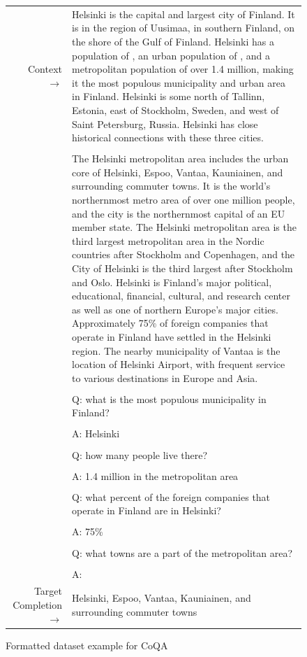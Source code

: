 \documentclass{article}
\begin{document}
\begin{figure} { \tt \footnotesize \begin{tabularx}{\linewidth}{r X} \toprule Context $\to$ & Helsinki is the capital and largest city of Finland. It is in the region of Uusimaa, in southern Finland, on the shore of the Gulf of Finland. Helsinki has a population of , an urban population of , and a metropolitan population of over 1.4 million, making it the most populous municipality and urban area in Finland. Helsinki is some north of Tallinn, Estonia, east of Stockholm, Sweden, and west of Saint Petersburg, Russia. Helsinki has close historical connections with these three cities. \\
 &  \\ 
 & The Helsinki metropolitan area includes the urban core of Helsinki, Espoo, Vantaa, Kauniainen, and surrounding commuter towns. It is the world's northernmost metro area of over one million people, and the city is the northernmost capital of an EU member state. The Helsinki metropolitan area is the third largest metropolitan area in the Nordic countries after Stockholm and Copenhagen, and the City of Helsinki is the third largest after Stockholm and Oslo. Helsinki is Finland's major political, educational, financial, cultural, and research center as well as one of northern Europe's major cities. Approximately 75\% of foreign companies that operate in Finland have settled in the Helsinki region. The nearby municipality of Vantaa is the location of Helsinki Airport, with frequent service to various destinations in Europe and Asia. \\ 
 &  \\ 
 & Q: what is the most populous municipality in Finland? \\ 
 &  \\ 
 & A: Helsinki \\ 
 &  \\ 
 & Q: how many people live there? \\ 
 &  \\ 
 & A: 1.4 million in the metropolitan area \\ 
 &  \\ 
 & Q: what percent of the foreign companies that operate in Finland are in Helsinki? \\ 
 &  \\ 
 & A: 75\% \\ 
 &  \\ 
 & Q: what towns are a part of the metropolitan area? \\ 
 &  \\ 
 & A: \\ 
 \midrule Target Completion $\to$ & Helsinki, Espoo, Vantaa, Kauniainen, and surrounding commuter towns \\
\bottomrule \end{tabularx} }  \caption{Formatted dataset example for CoQA}  \label{eval:CoQA}  \end{figure}
\end{document}
